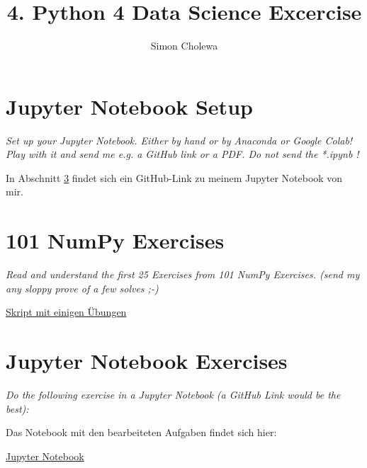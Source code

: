\documentclass[11pt,a4paper]{article}
\author{Simon Cholewa}
\title{4. Python 4 Data Science Excercise}
\begin{document}
\maketitle

\section{Jupyter Notebook Setup}
\textit{Set up your Jupyter Notebook. Either by hand or by Anaconda or Google Colab! Play with it and send me e.g. a GitHub link or a PDF.
Do not send the *.ipynb !}

In Abschnitt \ref{sec:jupyter} findet sich ein GitHub-Link zu meinem Jupyter Notebook von mir.
   
\section{101 NumPy Exercises}
\textit{Read and understand the first 25 Exercises from 101 NumPy Exercises. (send my any sloppy prove of a few solves ;-)}

\href{https://github.com/grutzwurst/Data_Science/blob/EA_04/EA_04/101.py}{Skript mit einigen Übungen}



\section{Jupyter Notebook Exercises}
\label{sec:jupyter}
\textit{Do the following exercise in a Jupyter Notebook (a GitHub Link would be the best):}

Das Notebook mit den bearbeiteten Aufgaben findet sich hier: 

\href{https://github.com/grutzwurst/Data_Science/blob/EA_04/EA_04/Aufg4.ipynb}{Jupyter Notebook}
\end{document}
